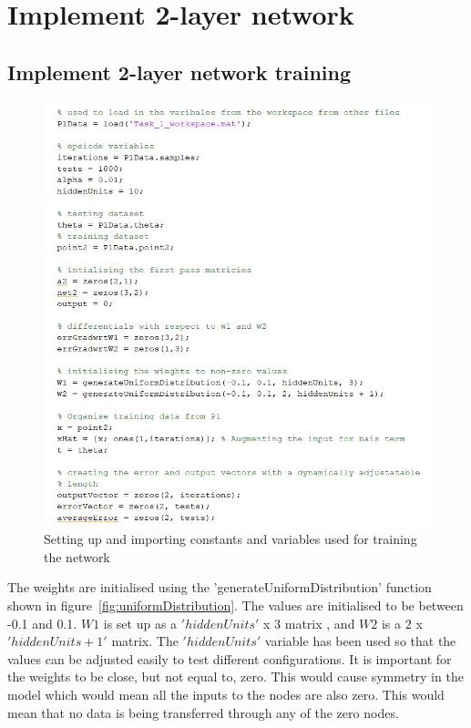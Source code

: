 \documentclass [11pt]{article}
\begin{document}
\section{Implement 2-layer network}
\subsection{Implement 2-layer network training}

\begin{figure}[H]
\centerline{\includegraphics[width=12cm]{Neural_network_defintions}}
\caption{Setting up and importing constants and variables used for training the network}
\label{fig:neuralNetworkDefinitions}
\end{figure}

The weights are initialised using the 'generateUniformDistribution' function shown in figure~\ref{fig:uniformDistribution}. The values are initialised to be between -0.1 and 0.1. $W1$ is set up as a $'hiddenUnits'$ x $3$ matrix , and $W2$ is a $2$ x $'hiddenUnits+1'$ matrix. The $'hiddenUnits'$ variable has been used so that the values can be adjusted easily to test different configurations. It is important for the weights to be close, but not equal to, zero. This would cause symmetry in the model which would mean all the inputs to the nodes are also zero. This would mean that no data is being transferred through any of the zero nodes. 
\end{document}
